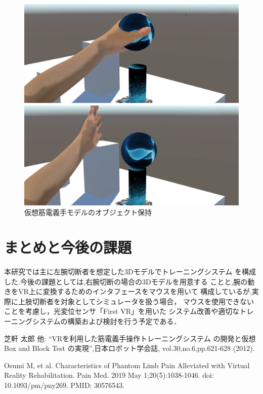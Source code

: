 \documentclass{ltjsarticle}
\begin{document}
		\begin{figure}[H]
		\centering
		\begin{minipage}{0.4\columnwidth}
		\centering
		\includegraphics[width = \columnwidth]{figs/spheregrap2.png}
		\end{minipage}
		\hspace{0.05\columnwidth}
		\begin{minipage}{0.4\columnwidth}
		\centering
		\includegraphics[width = \columnwidth]{figs/spherereleace.png}
		\end{minipage}
		\caption{仮想筋電義手モデルのオブジェクト保持}
		\label{fig:spheregrap}
		\end{figure}
		\vspace{-20pt}



\section{まとめと今後の課題}
	本研究では主に左腕切断者を想定した3Dモデルでトレーニングシステム
	を構成した.今後の課題としては,右腕切断の場合の3Dモデルを用意する
	ことと,腕の動きをVR上に変換するためのインタフェースをマウスを用いて
	構成しているが,実際に上肢切断者を対象としてシミュレータを扱う場合，
	マウスを使用できないことを考慮し，光変位センサ「First VR」を用いた
	システム改善や適切なトレーニングシステムの構築および検討を行う予定である．
\begin{thebibliography}{99}%
	芝軒 太郎 他:
	``VRを利用した筋電義手操作トレーニングシステム
	の開発と仮想 Box and Block Test の実現'',日本ロボット学会誌,
	vol.30,no.6,pp.621-628 (2012).

	Osumi M, et al.
	Characteristics of Phantom Limb Pain Alleviated with Virtual 
	Reality Rehabilitation. Pain Med. 2019 May 1;20(5):1038-1046.
	doi: 10.1093/pm/pny269. PMID: 30576543.
\end{thebibliography}
\end{document}

